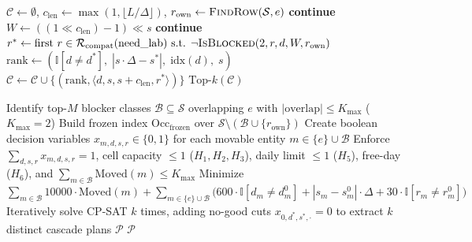 \documentclass[11pt,a4paper]{article}
\begin{document}
\begin{algorithm}[htbp]
\begin{algorithmic}[1]
\vspace{0.4em}
\State $\mathcal{C} \gets \emptyset$, \quad $c_{\text{len}} \gets \max(1, \lfloor L / \Delta \rfloor)$, \quad $r_{\text{own}} \gets \textsc{FindRow}(\mathcal{S}, e)$
        \State \textbf{continue} 
    \EndIf
        \State $W \gets ((1 \ll c_{\text{len}}) - 1) \ll s$
            \State \textbf{continue} 
        \EndIf
        \State $r^* \gets \text{first } r \in \mathcal{R}_{\text{compat}}(\text{need\_lab}) \text{ s.t. } \neg\textsc{IsBlocked}(2, r, d, W, r_{\text{own}})$ 
            \State $\text{rank} \gets (\mathbb{I}[d \neq d^*], \;|s\cdot\Delta - s^*|, \;\text{idx}(d), \;s)$
            \State $\mathcal{C} \gets \mathcal{C} \cup \{(\text{rank}, \langle d, s, s + c_{\text{len}}, r^* \rangle)\}$
        \EndIf
    \EndFor
\EndFor
{}
    \State \Return $\text{Top-}k(\mathcal{C})$
\EndIf

\vspace{0.4em}
\State Identify top-$M$ blocker classes $\mathcal{B} \subseteq \mathcal{S}$ overlapping $e$ with $|\text{overlap}| \le K_{\max}$ ($K_{\max} = 2$)
\State Build frozen index $\text{Occ}_{\text{frozen}}$ over $\mathcal{S} \setminus (\mathcal{B} \cup \{r_{\text{own}}\})$
\State Create boolean decision variables $x_{m, d, s, r} \in \{0, 1\}$ for each movable entity $m \in \{e\} \cup \mathcal{B}$
\State Enforce $\sum_{d,s,r} x_{m,d,s,r} = 1$, cell capacity $\le 1$ ($H_1, H_2, H_3$), daily limit $\le 1$ ($H_5$), free-day ($H_6$), and $\sum_{m \in \mathcal{B}} \text{Moved}(m) \le K_{\max}$
\State Minimize $\sum_{m \in \mathcal{B}} 10000 \cdot \text{Moved}(m) + \sum_{m \in \{e\} \cup \mathcal{B}} \big(600\cdot\mathbb{I}[d_m \neq d_m^0] + |s_m - s_m^0|\cdot\Delta + 30\cdot\mathbb{I}[r_m \neq r_m^0]\big)$
\State Iteratively solve CP-SAT $k$ times, adding no-good cuts $x_{0, d^*, s^*, \cdot} = 0$ to extract $k$ distinct cascade plans $\mathcal{P}$
\State \Return $\mathcal{P}$
\end{algorithmic}
\end{algorithm}
\end{document}
